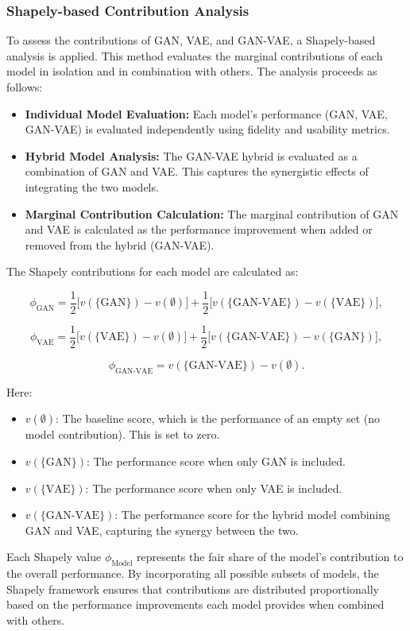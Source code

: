 \documentclass{article}
\begin{document}
\subsubsection*{Shapely-based Contribution Analysis}
To assess the contributions of GAN, VAE, and GAN-VAE, a Shapely-based analysis is applied. This method evaluates the marginal contributions of each model in isolation and in combination with others. The analysis proceeds as follows:
\begin{itemize}
    \item \textbf{Individual Model Evaluation:} Each model’s performance (GAN, VAE, GAN-VAE) is evaluated independently using fidelity and usability metrics.
    \item \textbf{Hybrid Model Analysis:} The GAN-VAE hybrid is evaluated as a combination of GAN and VAE. This captures the synergistic effects of integrating the two models.
    \item \textbf{Marginal Contribution Calculation:} The marginal contribution of GAN and VAE is calculated as the performance improvement when added or removed from the hybrid (GAN-VAE). 
\end{itemize}

The Shapely contributions for each model are calculated as:

\[
\phi_{\text{GAN}} = \frac{1}{2} \big[v(\{\text{GAN}\}) - v(\emptyset)\big] + \frac{1}{2} \big[v(\{\text{GAN-VAE}\}) - v(\{\text{VAE}\})\big],
\]

\[
\phi_{\text{VAE}} = \frac{1}{2} \big[v(\{\text{VAE}\}) - v(\emptyset)\big] + \frac{1}{2} \big[v(\{\text{GAN-VAE}\}) - v(\{\text{GAN}\})\big],
\]

\[
\phi_{\text{GAN-VAE}} = v(\{\text{GAN-VAE}\}) - v(\emptyset).
\]

Here:
\begin{itemize}
    \item \(v(\emptyset)\): The baseline score, which is the performance of an empty set (no model contribution). This is set to zero.
    \item \(v(\{\text{GAN}\})\): The performance score when only GAN is included.
    \item \(v(\{\text{VAE}\})\): The performance score when only VAE is included.
    \item \(v(\{\text{GAN-VAE}\})\): The performance score for the hybrid model combining GAN and VAE, capturing the synergy between the two.
\end{itemize}

Each Shapely value \(\phi_{\text{Model}}\) represents the fair share of the model’s contribution to the overall performance. By incorporating all possible subsets of models, the Shapely framework ensures that contributions are distributed proportionally based on the performance improvements each model provides when combined with others.
\end{document}
